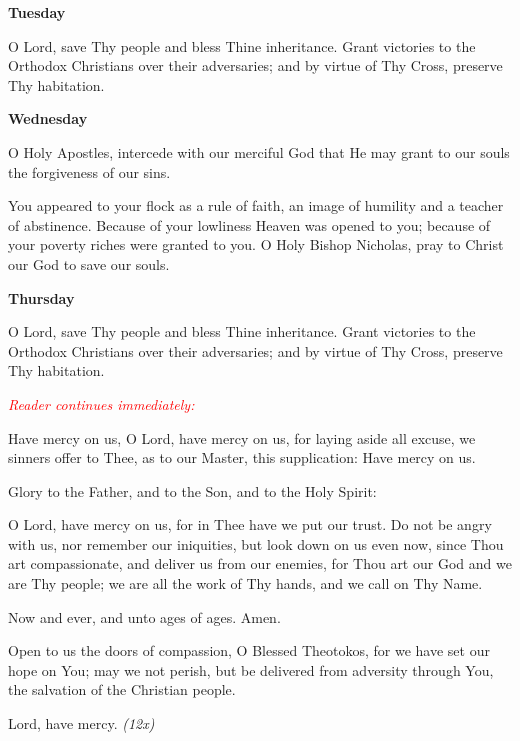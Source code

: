 \begin{center}
\textbf{Tuesday}
\end{center}

\begin{hang}
\noindent\makebox[\indt][l]{}O Lord, save Thy people and bless Thine inheritance.  Grant victories to the Orthodox Christians over their adversaries; and by virtue of Thy Cross, preserve Thy habitation.

\end{hang}


\begin{center}
\textbf{Wednesday}
\end{center}

\begin{hang}
\noindent\makebox[\indt][l]{}O Holy Apostles, intercede with our merciful God that He may grant to our souls the forgiveness of our sins.

You appeared to your flock as a rule of faith, an image of humility and a teacher of abstinence.  Because of your lowliness Heaven was opened to you; because of your poverty riches were granted to you.  O Holy Bishop Nicholas, pray to Christ our God to save our souls.

\end{hang}

\begin{center}
\textbf{Thursday}
\end{center}

\begin{hang}
\noindent\makebox[\indt][l]{}O Lord, save Thy people and bless Thine inheritance.  Grant victories to the Orthodox Christians over their adversaries; and by virtue of Thy Cross, preserve Thy habitation.

\end{hang}

\noindent
\textcolor{red}{\textit{Reader continues immediately:}}

\begin{hang}
\noindent\makebox[\indt][l]{}Have mercy on us, O Lord, have mercy on us, for laying aside all excuse, we sinners offer to Thee, as to our Master, this supplication: Have mercy on us.

Glory to the Father, and to the Son, and to the Holy Spirit:

O Lord, have mercy on us, for in Thee have we put our trust. Do not be angry with us, nor remember our iniquities, but look down on us even now, since Thou art compassionate, and deliver us from our enemies, for Thou art our God and we are Thy people; we are all the work of Thy hands, and we call on Thy Name.

Now and ever, and unto ages of ages.  Amen.

Open to us the doors of compassion, O Blessed Theotokos, for we have set our hope on You; may we not perish, but be delivered from adversity through You, the salvation of the Christian people.

Lord, have mercy. \textit{(12x)}

\end{hang}

